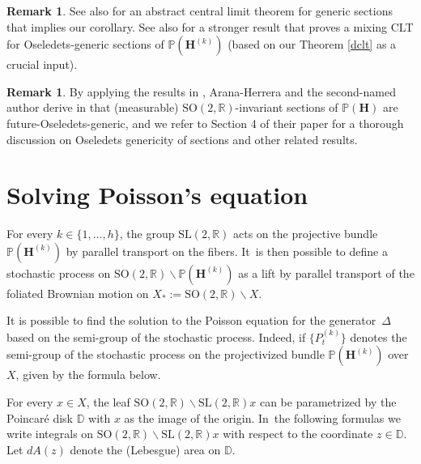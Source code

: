 \documentclass[10pt]{amsart}
\theoremstyle{plain}
\theoremstyle{definition}
\newtheorem{rem}[thm]{Remark}
\numberwithin{equation}{subsection}
\newcommand\bD{\mathbb{D}}
\newcommand\bP{\mathbb{P}}
\newcommand\bR{\mathbb{R}}\let\R\bR
\newcommand{\SL}{\mathrm{SL}}
\newcommand{\SO}{\mathrm{SO}}
\let\laplacian\Delta
\newcommand{\bfH}{\boldsymbol{H}}
\begin{document}
\begin{rem}
See also \cite[Th.\,3.10, 3.11, 3.21 \& 3.22]{AF24} for an abstract central limit theorem for generic sections that implies our corollary. See also \cite[Th.\,4.25]{AF24} for a stronger result that proves a mixing CLT for Oseledets-generic sections of $\bP(\bfH^{(k)})$ (based on our Theorem \ref{dclt} as a crucial input).
\end{rem}

\begin{rem}By applying the results in \cite{CE13,CF20, AAE+21}, Arana-Herrera and the second-named author derive in \cite[Th.\,4.32]{AF24} that (measurable) $\SO(2,\bR)$-invariant sections of $\bP(\bfH)$ are future-Oseledets-generic, and we refer to Section 4 of their paper for a thorough discussion on Oseledets genericity of sections and other related results.
\end{rem}

\appendix
\section{Solving Poisson's equation}\label{poisson}

For every $k\in \{1, \dots, h\}$, the group $\SL(2,\R)$ acts on the projective bundle $\bP(\bfH^{(k)})$
by parallel transport on the fibers. It~is then possible
to define a stochastic process on $ \SO(2,\R)\backslash \bP(\bfH^{(k)})$ as a lift by parallel transport of the foliated Brownian motion on $X_*:=\SO(2, \R)\backslash X$.

It is possible to find the solution to the Poisson
equation for the generator~$\laplacian$ based on the semi-group of the stochastic process. Indeed, if $\{P^{(k)}_t\}$ denotes the semi-group of the stochastic process on the projectivized bundle $\bP(\bfH^{(k)})$ over $X$, given by the formula below.

For every $x \in X$, the leaf $\SO(2,\R)\backslash \SL(2,\R) x$ can be parametrized by the Poincaré
disk $\bD$ with $x$ as the image of the origin. In~the following formulas we write integrals on $\SO(2,\R)\backslash \SL(2,\R) x$
with respect to the coordinate $z \in \bD$.
Let $dA(z)$ denote the (Lebesgue) area on $\bD$.
\end{document}
